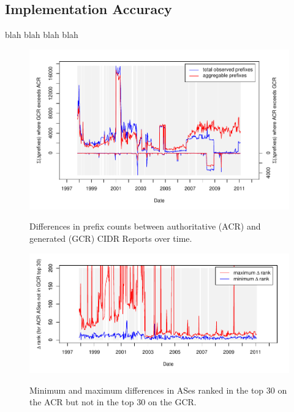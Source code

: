 \subsection{Implementation Accuracy}

blah blah blah blah

\begin{figure}[H]
\begin{centering}
    \includegraphics[width=6in]{figures/cidr_report_validity_prefix_error.pdf}
    \vspace{-2em}\\
    \caption{Differences in prefix counts between authoritative (ACR) and generated (GCR) CIDR Reports over time.}
\end{centering}
\end{figure}

\begin{figure}[H]
\begin{centering}
    \includegraphics[width=6in]{figures/cidr_report_validity_rank_error.pdf}
    \vspace{-2em}\\
    \caption{Minimum and maximum differences in ASes ranked in the top 30 on the ACR but not in the top 30 on the GCR.}
\end{centering}
\end{figure}

